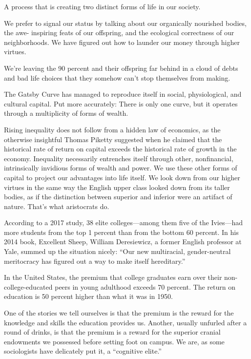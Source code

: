 \documentclass[
]{book}
\begin{document}
A process that is creating two distinct forms of life in our society.

We prefer to signal our
status by talking about our organically nourished bodies, the awe-
inspiring feats of our offspring, and the ecological correctness of our
neighborhoods. We have figured out how to launder our money
through higher virtues.

We're leaving the 90 percent and their offspring far behind in a cloud
of debts and bad life choices that they somehow can't stop themselves
from making.

The Gatsby Curve has managed to reproduce itself in social,
physiological, and cultural capital. Put more accurately: There is only
one curve, but it operates through a multiplicity of forms of wealth.

Rising inequality does not follow from a hidden law of economics, as
the otherwise insightful Thomas Piketty suggested when he claimed
that the historical rate of return on capital exceeds the historical rate
of growth in the economy. Inequality necessarily entrenches itself
through other, nonfinancial, intrinsically invidious forms of wealth
and power. We use these other forms of capital to project our
advantages into life itself. We look down from our higher virtues in
the same way the English upper class looked down from its taller
bodies, as if the distinction between superior and inferior were an
artifact of nature. That's what aristocrats do.

According to a 2017
study, 38 elite colleges---among them five of the Ivies---had more
students from the top 1 percent than from the bottom 60 percent. In
his 2014 book, Excellent Sheep, William Deresiewicz, a former
English professor at Yale, summed up the situation nicely: ``Our new
multiracial, gender-neutral meritocracy has figured out a way to make
itself hereditary.''

In the United States, the premium that college graduates earn over
their non-college-educated peers in young adulthood exceeds 70
percent. The return on education is 50 percent higher than what it
was in 1950.

One of the stories we tell ourselves is that the premium is the reward
for the knowledge and skills the education provides us. Another,
usually unfurled after a round of drinks, is that the premium is a
reward for the superior cranial endowments we possessed before
setting foot on campus. We are, as some sociologists have delicately
put it, a ``cognitive elite.''
\end{document}
